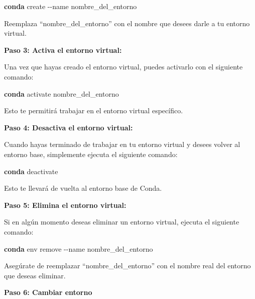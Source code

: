 \documentclass[
  letterpaper,
  DIV=11,
  numbers=noendperiod]{scrartcl}
\newenvironment{Shaded}{}{}
\newcommand{\AttributeTok}[1]{\textcolor[rgb]{0.84,0.23,0.29}{#1}}
\newcommand{\ExtensionTok}[1]{\textcolor[rgb]{0.84,0.23,0.29}{\textbf{#1}}}
\newcommand{\NormalTok}[1]{\textcolor[rgb]{0.14,0.16,0.18}{#1}}
\begin{document}
\begin{Shaded}
\begin{Highlighting}[]
\ExtensionTok{conda}\NormalTok{ create }\AttributeTok{{-}{-}name}\NormalTok{ nombre\_del\_entorno}
\end{Highlighting}
\end{Shaded}

Reemplaza ``nombre\_del\_entorno'' con el nombre que desees darle a tu
entorno virtual.

\textbf{Paso 3: Activa el entorno virtual:}

Una vez que hayas creado el entorno virtual, puedes activarlo con el
siguiente comando:

\begin{Shaded}
\begin{Highlighting}[]
\ExtensionTok{conda}\NormalTok{ activate nombre\_del\_entorno}
\end{Highlighting}
\end{Shaded}

Esto te permitirá trabajar en el entorno virtual específico.

\textbf{Paso 4: Desactiva el entorno virtual:}

Cuando hayas terminado de trabajar en tu entorno virtual y desees volver
al entorno base, simplemente ejecuta el siguiente comando:

\begin{Shaded}
\begin{Highlighting}[]
\ExtensionTok{conda}\NormalTok{ deactivate}
\end{Highlighting}
\end{Shaded}

Esto te llevará de vuelta al entorno base de Conda.

\textbf{Paso 5: Elimina el entorno virtual:}

Si en algún momento deseas eliminar un entorno virtual, ejecuta el
siguiente comando:

\begin{Shaded}
\begin{Highlighting}[]
\ExtensionTok{conda}\NormalTok{ env remove }\AttributeTok{{-}{-}name}\NormalTok{ nombre\_del\_entorno}
\end{Highlighting}
\end{Shaded}

Asegúrate de reemplazar ``nombre\_del\_entorno'' con el nombre real del
entorno que deseas eliminar.

\textbf{Paso 6: Cambiar entorno}
\end{document}
